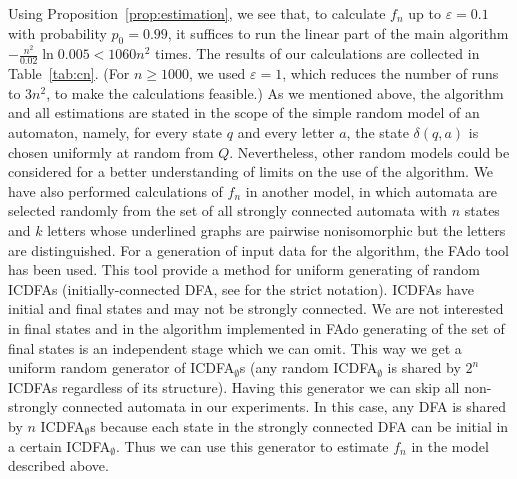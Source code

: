 \documentclass{jalc}
\begin{document}
Using Proposition~\ref{prop:estimation}, we see that, to calculate $f_n$ up to $\varepsilon=0.1$ with probability $p_0=0.99$, it suffices to run the linear part of the main algorithm $-\frac{n^2}{0.02} \ln{0.005} < 1060n^2$ times. The results of our calculations are collected in Table~\ref{tab:cn}. (For $n \geq 1000$, we used $\varepsilon=1$, which reduces the number of runs to $3n^2$, to make the calculations feasible.) As we mentioned above, the algorithm and all estimations are stated in the scope of the simple random model of an automaton, namely, for every state $q$ and every letter $a$, the state $\delta(q, a)$ is chosen uniformly at random from $Q$. Nevertheless, other random models could be considered for a better understanding of limits on the use of the algorithm. We have also performed calculations of $f_n$ in another model, in which automata are selected randomly from the set of all strongly connected automata with $n$ states and $k$ letters whose underlined graphs are pairwise nonisomorphic but the letters are distinguished. For a generation of input data for the algorithm, the FAdo tool \cite{almeida2009fado} has been used. This tool provide a method for uniform generating of random ICDFAs (initially-connected DFA, see \cite{almeida2009fado} for the strict notation). ICDFAs have initial and final states and may not be strongly connected. We are not interested in final states and in the algorithm implemented in FAdo generating of the set of final states is an independent stage which we can omit. This way we get a uniform random generator of ICDFA$_{\emptyset}$s (any random ICDFA$_{\emptyset}$ is shared by $2^n$ ICDFAs regardless of its structure). Having this generator we can skip all non-strongly connected automata in our experiments. In this case, any DFA is shared by $n$ ICDFA$_{\emptyset}$s because each state in the strongly connected DFA can be initial in a certain ICDFA$_{\emptyset}$. Thus we can use this generator to estimate $f_n$ in the model described above.
\end{document}

